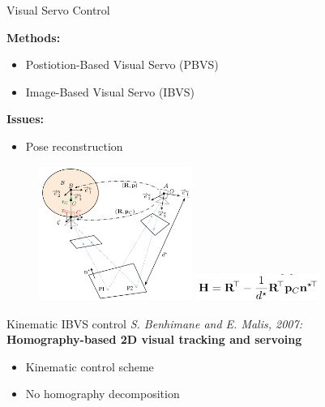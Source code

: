 \documentclass{beamer}
\begin{document}
\begin{frame}{Visual Servo Control}



\textbf{Methods:}
  \begin{itemize}
  \item
    Postiotion-Based Visual Servo (PBVS) 
  \item
    Image-Based Visual Servo (IBVS)
  \end{itemize}
\textbf{Issues:}
\begin{itemize}
	\item Pose reconstruction
\end{itemize}
\begin{figure}[ht!]
	\includegraphics[width=50mm]{Images/Notation.png}
	\includegraphics[width=40mm]{Images/Homography.png}
	
	\label{Notation}	
\end{figure}

\end{frame}

\begin{frame}{Kinematic IBVS control}
	\textit{S. Benhimane and E. Malis, 2007:}\\ \textbf{Homography-based 2D visual tracking and servoing}
\begin{itemize}
	\item Kinematic control scheme
	\item No homography decomposition 
\end{itemize}

 
\end{frame}
\end{document}
